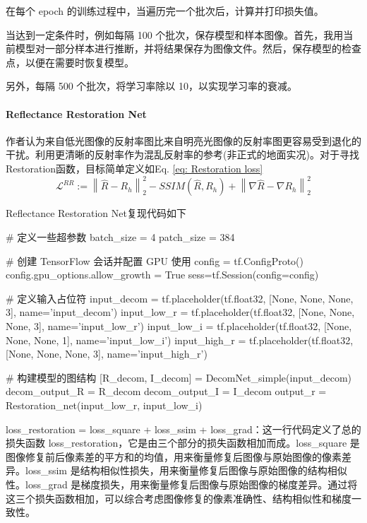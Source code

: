 \documentclass[letterpaper,12pt]{article}
\begin{document}
				在每个 epoch 的训练过程中，当遍历完一个批次后，计算并打印损失值。
				
				当达到一定条件时，例如每隔 100 个批次，保存模型和样本图像。首先，我用当前模型对一部分样本进行推断，并将结果保存为图像文件。然后，保存模型的检查点，以便在需要时恢复模型。
				
				另外，每隔 500 个批次，将学习率除以 10，以实现学习率的衰减。
		
			\paragraph{Reflectance Restoration Net}
			
				作者认为来自低光图像的反射率图比来自明亮光图像的反射率图更容易受到退化的干扰。利用更清晰的反射率作为混乱反射率的参考(非正式的地面实况)。对于寻找Restoration函数，目标简单定义如Eq. \ref{eq: Restoration loss}
				\begin{equation}
					\mathcal{L}^{RR}:={\left\| \hat{R}-R_{h} \right\|}^{2}_{2} - SSIM(\hat{R},R_{h}) + {\left\|\nabla\hat{R}-\nabla R_{h} \right\|}^{2}_{2}
					\label{eq: Restoration loss}
				\end{equation}
				
				Reflectance Restoration Net复现代码如下
				
				\begin{python}
				# 定义一些超参数
				batch_size = 4
				patch_size = 384
					
				# 创建 TensorFlow 会话并配置 GPU 使用
				config = tf.ConfigProto()
				config.gpu_options.allow_growth = True
				sess=tf.Session(config=config)
					
				# 定义输入占位符
				input_decom = tf.placeholder(tf.float32, [None, None, None, 3], name='input_decom')
				input_low_r = tf.placeholder(tf.float32, [None, None, None, 3], name='input_low_r')
				input_low_i = tf.placeholder(tf.float32, [None, None, None, 1], name='input_low_i')
				input_high_r = tf.placeholder(tf.float32, [None, None, None, 3], name='input_high_r')
					
				# 构建模型的图结构
				[R_decom, I_decom] = DecomNet_simple(input_decom)
				decom_output_R = R_decom
				decom_output_I = I_decom
				output_r = Restoration_net(input_low_r, input_low_i)
				\end{python}
				
				loss\_restoration = loss\_square + loss\_ssim + loss\_grad：这一行代码定义了总的损失函数 loss\_restoration，它是由三个部分的损失函数相加而成。loss\_square 是图像修复前后像素差的平方和的均值，用来衡量修复后图像与原始图像的像素差异。loss\_ssim 是结构相似性损失，用来衡量修复后图像与原始图像的结构相似性。loss\_grad 是梯度损失，用来衡量修复后图像与原始图像的梯度差异。通过将这三个损失函数相加，可以综合考虑图像修复的像素准确性、结构相似性和梯度一致性。
				
\end{document}
